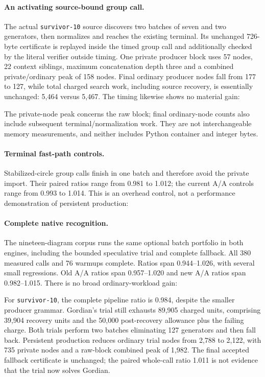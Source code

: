 \paragraph{An activating source-bound group call.}
The actual \texttt{survivor-10} source discovers two batches of seven and two
generators, then normalizes and reaches the existing terminal. Its unchanged
726-byte certificate is replayed inside the timed group call and additionally
checked by the literal verifier outside timing. One private producer block
uses 57 nodes, 22 context siblings, maximum concatenation depth three and a
combined private/ordinary peak of 158 nodes. Final ordinary producer nodes
fall from 177 to 127, while total charged search work, including source
recovery, is essentially unchanged: 5,464 versus 5,467. The timing likewise
shows no material gain:


The private-node peak concerns the raw block; final ordinary-node counts also
include subsequent terminal/normalization work. They are not interchangeable
memory measurements, and neither includes Python container and integer bytes.

\paragraph{Terminal fast-path controls.}
Stabilized-circle group calls finish in one batch and therefore avoid the
private import. Their paired ratios range from 0.981 to 1.012; the current
A/A controls range from 0.993 to 1.014. This is an overhead control, not a
performance demonstration of persistent production:


\paragraph{Complete native recognition.}
The nineteen-diagram corpus runs the same optional batch portfolio in both
engines, including the bounded speculative trial and complete fallback.
All 380 measured calls and 76 warmups complete. Ratios span 0.944--1.026,
with several small regressions. Old A/A ratios span 0.957--1.020 and new A/A
ratios span 0.982--1.015. There is no broad ordinary-workload gain:


For \texttt{survivor-10}, the complete pipeline ratio is 0.984, despite the
smaller producer grammar. Gordian's trial still exhausts 89,905 charged units,
comprising 39,904 recovery units and the 50,000 post-recovery allowance plus
the failing charge. Both trials perform two batches eliminating 127 generators
and then fall back. Persistent production reduces ordinary trial nodes from
2,788 to 2,122, with 735 private nodes and a raw-block combined peak of 1,982.
The final accepted fallback certificate is unchanged; the paired whole-call
ratio 1.011 is not evidence that the trial now solves Gordian.

